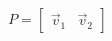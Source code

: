 \documentclass[preview]{standalone}
\begin{document}
\begin{align*}
P = \begin{bmatrix} \vec{v}_1 & \vec{v}_2 \end{bmatrix}
\end{align*}
\end{document}
